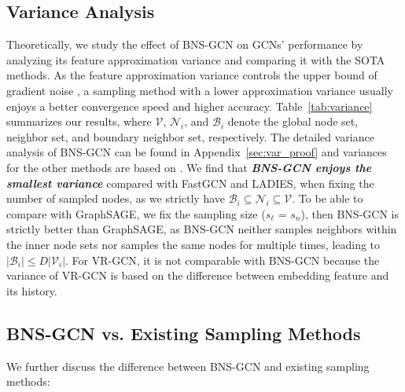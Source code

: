 \documentclass{article}
\begin{document}
\subsection{Variance Analysis}
\label{sec:BNS-theory}
Theoretically, we study the effect of BNS-GCN on GCNs' performance by analyzing its feature approximation variance and comparing it with the SOTA methods. 
As the feature approximation variance controls the upper bound of gradient noise \citep{cong2020minimal}, a sampling method with a lower approximation variance usually enjoys a better convergence speed \citep{gower2019sgd} and higher accuracy.
Table~\ref{tab:variance} summarizes our results,  
where $\mathcal{V}$, $\mathcal{N}_i$, and $\mathcal{B}_i$ denote the global node set, neighbor set, and boundary neighbor set, respectively.
The detailed variance analysis of BNS-GCN can be found in Appendix~\ref{sec:var_proof} and variances for the other methods are based on \citep{zou2019layer}.
We find that \textit{\textbf{BNS-GCN enjoys the smallest variance}} compared with FastGCN and LADIES, when fixing the number of sampled nodes, as we strictly have $\mathcal{B}_i\subseteq\mathcal{N}_i\subseteq\mathcal{V}$.
To be able to compare with GraphSAGE, we fix the sampling size ($s_\ell$ = $s_n$), 
then BNS-GCN is strictly better than GraphSAGE, as BNS-GCN neither samples neighbors within the inner node sets nor samples the same nodes for multiple times, leading to $|\mathcal{B}_i|\leq D|\mathcal{V}_i|$.  
For VR-GCN, it is not comparable with BNS-GCN because the variance of VR-GCN is based on the difference between embedding feature and its history.


\subsection{BNS-GCN vs. Existing Sampling Methods}
\label{sec:BNS-Discuss}
We further discuss the difference between
BNS-GCN and existing sampling methods:
\end{document}
